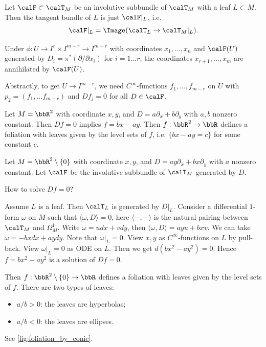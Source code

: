 \begin{remark}
  Let $\calF \subset \calT_M$ be an involutive subbundle of $\calT_M$ with a leaf $L \subset M$.
  Then the tangent bundle of $L$ is just $\calF|_L$, i.e. 
  \[ \calF|_L = \Image(\calT_L \to \calT_M|_L). \]

  Under $\phi: U \to I^r \times I^{m-r} \to I^{m-r}$ with coordinates $x_1, ..., x_n$ and $\calF(U)$ generated by $D_i = \pi^* (\partial / \partial x_i)$ for $i=1...r$, the coordinates $x_{r+1}, ..., x_m$ are annihilated by $\calF(U)$.

  Abstractly, to get $U \to I^{m-r}$, we need $C^\infty$-functions $f_1,...,f_{m-r}$ on $U$ with $p_2 = (f_1,...f_{m-r})$ and $D f_j = 0$ for all $D \in \calF$.
\end{remark}

    
\begin{example}
    
  Let $M = \bbR^2$ with coordinate $x,y$, and $D = a \partial_x + b \partial_y$ with $a,b$ nonzero constant.
  Then $D f = 0$ implies $f = b x - a y$.
  Then $f: \bbR^2 \to \bbR$ defines a foliation with leaves given by the level sets of $f$, i.e. $\{b x - a y = c\}$ for some constant $c$.
\end{example}

\begin{example}\label{eg:foliation_by_conics}
  Let $M = \bbR^2 \setminus \{0\}$ with coordinate $x,y$, and $D = a y \partial_x + b x \partial_y$ with $a$ nonzero constant.
  Let $\calF$ be the involutive subbundle of $\calT_M$ generated by $D$.
  
  How to solve $D f = 0$?
  
  Assume $L$ is a leaf.
  Then $\calT_L$ is generated by $D|_L$.
  Consider a differential $1$-form $\omega$ on $M$ such that $\langle \omega,D \rangle = 0$, here $\langle -,- \rangle$ is the natural pairing between $\calT_M$ and $\Omega^1_M$.
  Write $\omega = u d x + v d y$, then $\langle \omega, D \rangle = a y u + b x v$.
  We can take $\omega = -b x d x + a y d y$.
  Note that $\omega|_L = 0$.
  View $x,y$ as $C^\infty$-functions on $L$ by pull-back.
  View $\omega|_L = 0$ as ODE on $L$.
  Then we get $d (b x^2 - a y^2) = 0$.
  Hence $f = b x^2 - a y^2$ is a solution of $D f = 0$.

  Then $f: \bbR^2 \setminus \{0\} \to \bbR$ defines a foliation with leaves given by the level sets of $f$.
  There are two types of leaves:
  \begin{itemize}
    \item $a / b > 0$: the leaves are hyperbolas;
    \item $a / b < 0$: the leaves are ellipses.
  \end{itemize}
  See \cref{fig:foliation_by_conic}.
\end{example}


